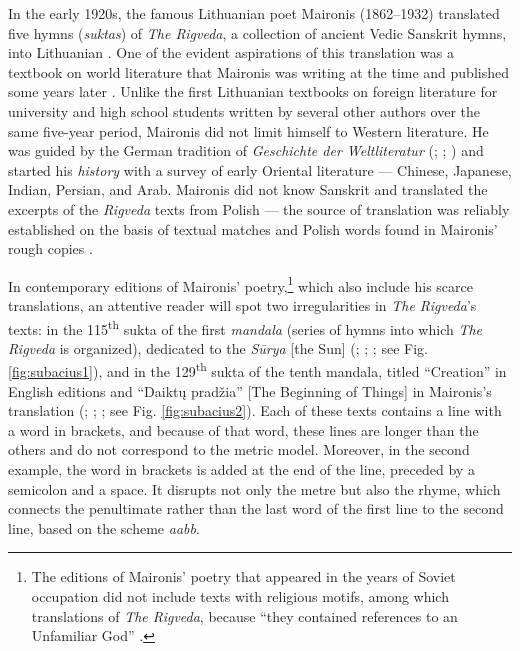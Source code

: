 \documentclass{article}
\begin{document}
In the early 1920s, the famous Lithuanian poet Maironis (1862--1932)
translated five hymns (\emph{suktas}) of \emph{The Rigveda}, a collection of
ancient Vedic Sanskrit hymns, into Lithuanian \citep{maironis_vertimai_1923}. One of
the evident aspirations of this translation was a textbook on world
literature that Maironis was writing at the time and published some
years later \citep{maironis_maironio_1926}. Unlike the first Lithuanian textbooks on
foreign literature for university and high school students written by
several other authors over the same five-year period, Maironis did not
limit himself to Western literature. He was guided by the German
tradition of \emph{Geschichte der Weltliteratur} (\citealt{baumgartner_geschichte_1897}; \citealt{wiegler_geschichte_1914};
\citealt{henschke_geschichte_1922}) and started his \emph{history} with a survey
of early Oriental literature –– Chinese, Japanese, Indian, Persian, and
Arab. Maironis did not know Sanskrit and translated the excerpts of the
\emph{Rigveda} texts from Polish \citep{michalski_czterdziesci_1912} –– the source of translation
was reliably established on the basis of textual matches and Polish
words found in Maironis' rough copies \citep[9v]{maironis_daiktu_1922}.

In contemporary editions of Maironis' poetry,\footnote{The editions
  of Maironis' poetry that appeared in the years of Soviet occupation did not include
  texts with religious motifs, among which translations of \emph{The Rigveda}, because ``they contained references to an
  Unfamiliar God'' \citep[339]{brazaitis_maironis_1957}.} which also include his scarce
translations, an attentive reader will spot two irregularities in
\emph{The Rigveda}'s texts: in the 115\textsuperscript{th}
sukta of the first \emph{mandala} (series of hymns into which \emph{The
Rigveda} is organized), dedicated to the \emph{Sūrya} {[}the Sun{]} (\citealp[232]{maironis_rastai_1987}; \citealp[235]{maironis_pavasario_2012}; \citealp[308]{maironis_pavasario_2020-1}; see Fig. \ref{fig:subacius1}), and
in the 129\textsuperscript{th} sukta of the tenth mandala, titled
``Creation'' in English editions \citep[1607]{jamison_rigveda_2014} and
``Daiktų pradžia'' {[}The Beginning of Things{]} in Maironis's
translation (\citealp[226]{maironis_rastai_1987}; \citealp[230]{maironis_pavasario_2012}; \citealp[300]{maironis_pavasario_2020-1}; see Fig. \ref{fig:subacius2}). Each of these texts contains a line with a word in
brackets, and because of that word, these lines are longer than the
others and do not correspond to the metric model. Moreover, in the
second example, the word in brackets is added at the end of the line,
preceded by a semicolon and a space. It disrupts not only the metre but
also the rhyme, which connects the penultimate rather than the last word
of the first line to the second line, based on the scheme \emph{aabb}.
\end{document}
